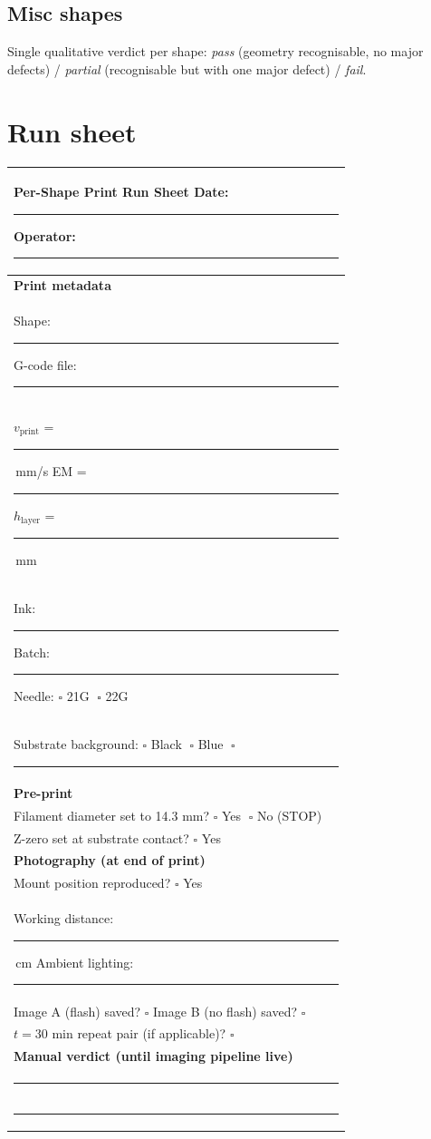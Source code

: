 \documentclass[11pt,a4paper]{article}
\begin{document}
\subsection{Misc shapes}
Single qualitative verdict per shape: \emph{pass} (geometry
recognisable, no major defects) / \emph{partial} (recognisable
but with one major defect) / \emph{fail}.

\section{Run sheet}
\label{sec:runsheet}

\begin{center}
\small
\begin{tabular}{|p{0.95\linewidth}|}
\hline
\textbf{Per-Shape Print Run Sheet} \quad
Date: \rule{2.5cm}{0.4pt} \quad
Operator: \rule{3cm}{0.4pt} \\
\hline
\textbf{Print metadata} \\
Shape: \rule{4cm}{0.4pt} \quad
G-code file: \rule{6cm}{0.4pt} \\
$v_\mathrm{print}$ = \rule{1.4cm}{0.4pt}\,mm/s \quad
EM = \rule{1.2cm}{0.4pt} \quad
$h_\mathrm{layer}$ = \rule{1.4cm}{0.4pt}\,mm \\
Ink: \rule{4cm}{0.4pt} \quad
Batch: \rule{2.5cm}{0.4pt} \quad
Needle: $\square$ 21G $\;\square$ 22G \\
Substrate background: $\square$ Black $\;\square$ Blue $\;\square$ \rule{2.5cm}{0.4pt} \\[3pt]
\hline
\textbf{Pre-print} \\
Filament diameter set to 14.3 mm? $\square$ Yes $\;\square$ No (STOP) \\
Z-zero set at substrate contact? $\square$ Yes \\
\hline
\textbf{Photography (at end of print)} \\
Mount position reproduced? $\square$ Yes \\
Working distance: \rule{2cm}{0.4pt}\,cm \quad
Ambient lighting: \rule{4cm}{0.4pt} \\
Image A (flash) saved? $\square$ \quad
Image B (no flash) saved? $\square$ \\
$t=30$ min repeat pair (if applicable)? $\square$ \\
\hline
\textbf{Manual verdict (until imaging pipeline live)} \\
\rule{0.93\linewidth}{0.4pt} \\
\rule{0.93\linewidth}{0.4pt} \\
\hline
\end{tabular}
\end{center}
\end{document}
